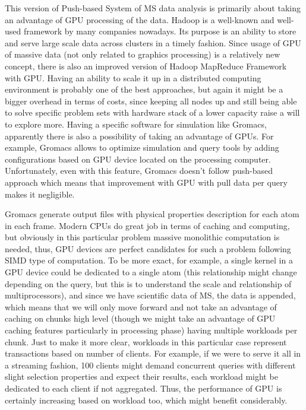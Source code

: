 \documentclass[11pt,a4paper]{report}
\begin{document}
This version of Push-based System of MS data analysis is primarily about taking an advantage of GPU processing of the data. Hadoop is a well-known and well-used framework by many companies nowadays\cite{hadoop}. Its purpose is an ability to store and serve large scale data across clusters in a timely fashion. Since usage of GPU of massive data (not only related to graphics processing) is a relatively new concept, there is also an improved version of Hadoop MapReduce Framework with GPU\cite{hadoopgpu}. Having an ability to scale it up in a distributed computing environment is probably one of the best approaches, but again it might be a bigger overhead in terms of costs, since keeping all nodes up and still being able to solve specific problem sets with hardware stack of a lower capacity raise a will to explore more. Having a specific software for simulation like Gromacs, apparently there is also a possibility of taking an advantage of GPUs. For example, Gromacs allows to optimize simulation and query tools by adding configurations based on GPU device located on the processing computer. Unfortunately, even with this feature, Gromacs doesn't follow push-based approach which means that improvement with GPU with pull data per query makes it negligible.

Gromacs generate output files with physical properties description for each atom in each frame. Modern CPUs do great job in terms of caching and computing, but obviously in this particular problem massive monolithic computation is needed, thus, GPU devices are perfect candidates for such a problem following SIMD type of computation. To be more exact, for example, a single kernel in a GPU device could be dedicated to a single atom (this relationship might change depending on the query, but this is to understand the scale and relationship of multiprocessors), and since we have scientific data of MS, the data is appended, which means that we will only move forward and not take an advantage of caching on chunks high level (though we might take an advantage of GPU caching features particularly in processing phase) having multiple workloads per chunk. Just to make it more clear, workloads in this particular case represent transactions based on number of clients. For example, if we were to serve it all in a streaming fashion, 100 clients might demand concurrent queries with different slight selection properties and expect their results, each workload might be dedicated to each client if not aggregated. Thus, the performance of GPU is certainly increasing based on workload too, which might benefit considerably.
\end{document}
